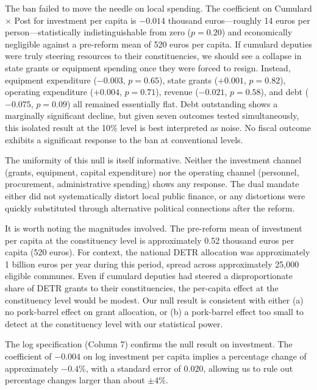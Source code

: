 \documentclass[12pt]{article}
\begin{document}


The ban failed to move the needle on local spending. The coefficient on Cumulard $\times$ Post for investment per capita is $-0.014$ thousand euros---roughly 14 euros per person---statistically indistinguishable from zero ($p = 0.20$) and economically negligible against a pre-reform mean of 520 euros per capita. If cumulard deputies were truly steering resources to their constituencies, we should see a collapse in state grants or equipment spending once they were forced to resign. Instead, equipment expenditure ($-0.003$, $p = 0.65$), state grants ($+0.001$, $p = 0.82$), operating expenditure ($+0.004$, $p = 0.71$), revenue ($-0.021$, $p = 0.58$), and debt ($-0.075$, $p = 0.09$) all remained essentially flat. Debt outstanding shows a marginally significant decline, but given seven outcomes tested simultaneously, this isolated result at the 10\% level is best interpreted as noise. No fiscal outcome exhibits a significant response to the ban at conventional levels.

The uniformity of this null is itself informative. Neither the investment channel (grants, equipment, capital expenditure) nor the operating channel (personnel, procurement, administrative spending) shows any response. The dual mandate either did not systematically distort local public finance, or any distortions were quickly substituted through alternative political connections after the reform.

It is worth noting the magnitudes involved. The pre-reform mean of investment per capita at the constituency level is approximately 0.52 thousand euros per capita (520 euros). For context, the national DETR allocation was approximately 1 billion euros per year during this period, spread across approximately 25,000 eligible communes. Even if cumulard deputies had steered a disproportionate share of DETR grants to their constituencies, the per-capita effect at the constituency level would be modest. Our null result is consistent with either (a) no pork-barrel effect on grant allocation, or (b) a pork-barrel effect too small to detect at the constituency level with our statistical power.

The log specification (Column 7) confirms the null result on investment. The coefficient of $-0.004$ on log investment per capita implies a percentage change of approximately $-0.4$\%, with a standard error of $0.020$, allowing us to rule out percentage changes larger than about $\pm 4$\%.
\end{document}

